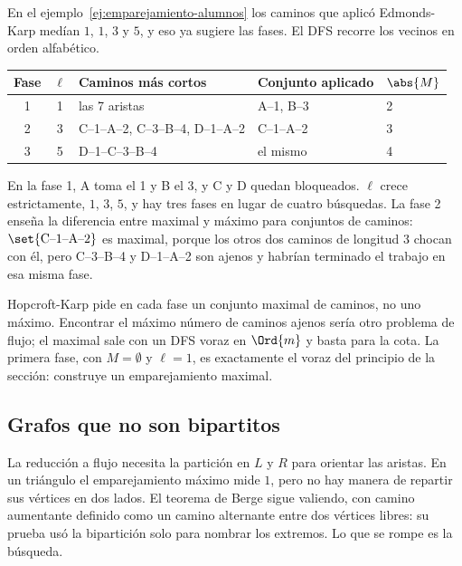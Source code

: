 \documentclass[11pt,letterpaper]{article}
\begin{document}
\begin{ejemplo}
  \label{ej:emparejamiento-hopcroft-karp}
  En el ejemplo~\ref{ej:emparejamiento-alumnos} los caminos que aplicó
  Edmonds-Karp medían $1$, $1$, $3$ y $5$, y eso ya sugiere las
  fases. El DFS recorre los vecinos en orden alfabético.
  \begin{center}
  \small
  \begin{tabular}{cclll}
    \toprule
    \textbf{Fase} & $\ell$ & \textbf{Caminos más cortos}
      & \textbf{Conjunto aplicado} & $\abs{M}$ \\
    \midrule
    1 & 1 & las 7 aristas & A--1, B--3 & 2 \\
    2 & 3 & C--1--A--2, C--3--B--4, D--1--A--2 & C--1--A--2 & 3 \\
    3 & 5 & D--1--C--3--B--4 & el mismo & 4 \\
    \bottomrule
  \end{tabular}
  \end{center}
  En la fase 1, A toma el 1 y B el 3, y C y D quedan bloqueados.
  $\ell$ crece estrictamente, $1$, $3$, $5$, y hay tres fases en lugar
  de cuatro búsquedas. La fase 2 enseña la diferencia entre maximal y
  máximo para conjuntos de caminos: $\set{\text{C--1--A--2}}$ es
  maximal, porque los otros dos caminos de longitud $3$ chocan con
  él, pero C--3--B--4 y D--1--A--2 son ajenos y habrían terminado el
  trabajo en esa misma fase.
\end{ejemplo}

\begin{ojo}
  Hopcroft-Karp pide en cada fase un conjunto maximal de caminos, no
  uno máximo. Encontrar el máximo número de caminos ajenos sería otro
  problema de flujo; el maximal sale con un DFS voraz en $\Ord{m}$ y
  basta para la cota. La primera fase, con $M = \emptyset$ y
  $\ell = 1$, es exactamente el voraz del principio de la sección:
  construye un emparejamiento maximal.
\end{ojo}


\subsection*{Grafos que no son bipartitos}

La reducción a flujo necesita la partición en $L$ y $R$ para orientar
las aristas. En un triángulo el emparejamiento máximo mide $1$, pero
no hay manera de repartir sus vértices en dos lados. El teorema de
Berge sigue valiendo, con camino aumentante definido como un camino
alternante entre dos vértices libres: su prueba usó la bipartición
solo para nombrar los extremos. Lo que se rompe es la búsqueda.
\end{document}
